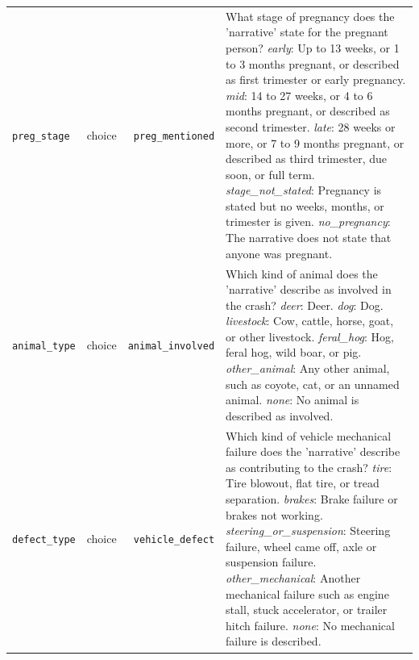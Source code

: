 \begin{small}
\begin{longtable}{lrr>{\raggedright\arraybackslash}p{267.2pt}}
\texttt{preg\_stage} & choice & \texttt{preg\_mentioned} & What stage of pregnancy does the 'narrative' state for the pregnant person? \newline \textit{early}: Up to 13 weeks, or 1 to 3 months pregnant, or described as first trimester or early pregnancy. \newline \textit{mid}: 14 to 27 weeks, or 4 to 6 months pregnant, or described as second trimester. \newline \textit{late}: 28 weeks or more, or 7 to 9 months pregnant, or described as third trimester, due soon, or full term. \newline \textit{stage\_not\_stated}: Pregnancy is stated but no weeks, months, or trimester is given. \newline \textit{no\_pregnancy}: The narrative does not state that anyone was pregnant. \\
\texttt{animal\_type} & choice & \texttt{animal\_involved} & Which kind of animal does the 'narrative' describe as involved in the crash? \newline \textit{deer}: Deer. \newline \textit{dog}: Dog. \newline \textit{livestock}: Cow, cattle, horse, goat, or other livestock. \newline \textit{feral\_hog}: Hog, feral hog, wild boar, or pig. \newline \textit{other\_animal}: Any other animal, such as coyote, cat, or an unnamed animal. \newline \textit{none}: No animal is described as involved. \\
\texttt{defect\_type} & choice & \texttt{vehicle\_defect} & Which kind of vehicle mechanical failure does the 'narrative' describe as contributing to the crash? \newline \textit{tire}: Tire blowout, flat tire, or tread separation. \newline \textit{brakes}: Brake failure or brakes not working. \newline \textit{steering\_or\_suspension}: Steering failure, wheel came off, axle or suspension failure. \newline \textit{other\_mechanical}: Another mechanical failure such as engine stall, stuck accelerator, or trailer hitch failure. \newline \textit{none}: No mechanical failure is described. \\

\end{longtable}
\end{small}
